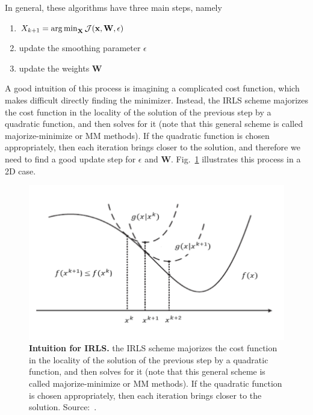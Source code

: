 In general, these algorithms have three main steps, namely
\begin{enumerate}
    \item $X_{k+1} = \operatorname*{arg\,min}_\mathbf{X} \mathcal{J}(\mathbf{x}, \mathbf{W}, \epsilon)$
    \item update the smoothing parameter $\epsilon$
    \item update the weights $\mathbf{W}$
\end{enumerate}
A good intuition of this process is imagining a complicated cost function, which makes difficult directly finding the minimizer. Instead, the IRLS scheme majorizes the cost function in the locality of the solution of the previous step by a quadratic function, and then solves for it (note that this general scheme is called majorize-minimize or MM methods). If the quadratic function is chosen appropriately, then each iteration brings closer to the solution, and therefore we need to find a good update step for $\epsilon$ and $\mathbf{W}$. Fig.~\ref{fig:mm-intuition} illustrates this process in a 2D case.

\begin{figure}
    \centering
    \includegraphics[width=0.5\linewidth]{images/mm-methods.png}
    \caption{\textbf{Intuition for IRLS.} the IRLS scheme majorizes the cost function in the locality of the solution of the previous step by a quadratic function, and then solves for it (note that this general scheme is called majorize-minimize or MM methods). If the quadratic function is chosen appropriately, then each iteration brings closer to the solution. Source:~\cite{noauthor_novel_nodate}.}
    \label{fig:mm-intuition}
\end{figure}

